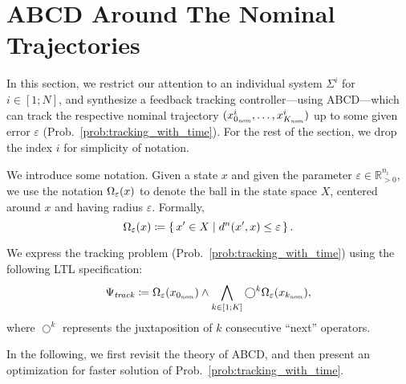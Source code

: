 \section{ABCD Around The Nominal Trajectories}\label{sec:tracking}

In this section, we restrict our attention to an individual system $\Sigma^i$ for $i\in [1;N]$, and synthesize a feedback tracking controller---using ABCD---which can track the respective nominal trajectory $(x_{0_{\mathit{nom}}}^i,\ldots,x_{K_{\mathit{nom}}}^i)$ up to some given error $\varepsilon$ (Prob.~\ref{prob:tracking_with_time}).
For the rest of the section, we drop the index $i$ for simplicity of notation.

We introduce some notation.
Given a state $x$ and given the parameter $\varepsilon\in \mathbb{R}_{>0}^{n_i}$, we use the notation $\Omega_\varepsilon( x)$ to denote the ball in the state space $X$, centered around $x$ and having radius $\varepsilon$.
Formally, \[\Omega_\varepsilon(x)\coloneqq \set{x'
	\in X \mid  d^n(x',x)\leq \varepsilon }.\] 

We express the tracking problem (Prob.~\ref{prob:tracking_with_time}) using the following LTL specification:
\begin{align}
	\Psi_{\mathit{track}}\coloneqq \Omega_\varepsilon(x_{0_{\mathit{nom}}}) \wedge \bigwedge_{k\in [1;K]} \bigcirc^k \Omega_\varepsilon(x_{k_{\mathit{nom}}}),
\end{align}
where $\bigcirc^k$ represents the juxtaposition of $k$ consecutive ``next'' operators.

In the following, we first revisit the theory of ABCD, and then present an optimization for faster solution of Prob.~\ref{prob:tracking_with_time}.
 
 \begin{comment}
The specification $\Psi_\track$ in general requires controller with memory, as we show in the following example.

\begin{example}
	Consider the one-dimensional control system $(\mathbb{R},\set{0,+1}, \emptyset, f)$ with the following dynamics:
	\begin{align*}
		\dot{\xi} = f(\xi,u) = u.
	\end{align*}
	Let the sampling time be $1$, the nominal trajectory be $(0,1,0,-1)$, and 
\end{example}
\end{comment}

